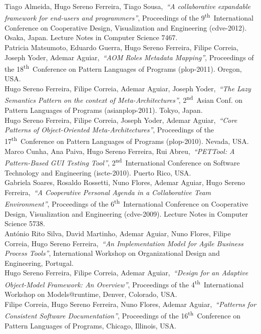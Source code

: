 \documentclass[9pt, a4paper, pstricks]{article}
\newcommand{\years}[1]{\marginnote{\small #1}}
\newcommand{\nth}{\textsuperscript{th}~}
\newcommand{\nd}{\textsuperscript{nd}~}
\newcommand{\publication}[4]{\years{#1}#2,~\emph{``#3''}, #4}
\begin{document}
{\publication{2012}{Tiago Almeida, Hugo Sereno Ferreira, Tiago Sousa}{A collaborative expandable framework for end-users and programmers}{Proceedings of the 9\nth International Conference on Cooperative Design, Visualization and Engineering {\sc (cdve-2012)}. Osaka, Japan. Lecture Notes in Computer Science 7467.}\\
\publication{2011}{Patricia Matsumoto, Eduardo Guerra, Hugo Sereno Ferreira, Filipe Correia, Joseph Yoder, Ademar Aguiar}{AOM Roles Metadata Mapping}{Proceedings of the 18\nth Conference on Pattern Languages of Programs {\sc (plop-2011)}. Oregon, USA.}\\
\publication{2011}{Hugo Sereno Ferreira, Filipe Correia, Ademar Aguiar, Joseph Yoder}{The Lazy Semantics Pattern on the context of Meta-Architectures}{2\nd Asian Conf. on Pattern Languages of Programs {\sc (asianplop-2011)}. Tokyo, Japan.}\\
\publication{2010}{Hugo Sereno Ferreira, Filipe Correia, Joseph Yoder, Ademar Aguiar}{Core Patterns of Object-Oriented Meta-Architectures}{Proceedings of the 17\nth Conference on Pattern Languages of Programs  {\sc (plop-2010)}. Nevada, USA.}\\
\publication{2010}{Marco Cunha, Ana Paiva, Hugo Sereno Ferreira, Rui Abreu}{PETTool: A Pattern-Based GUI Testing Tool}{2\nd International Conference on Software Technology and Engineering  {\sc (iscte-2010)}. Puerto Rico, USA.}\\
\publication{2009}{Gabriela Soares, Rosaldo Rossetti, Nuno Flores, Ademar Aguiar, Hugo Sereno Ferreira}{A Cooperative Personal Agenda in a Collaborative Team Environment}{Proceedings of the 6\nth International Conference on Cooperative Design, Visualization and Engineering {\sc (cdve-2009)}. Lecture Notes in Computer Science 5738.}\\
\publication{2009}{António Rito Silva, David Martinho, Ademar Aguiar, Nuno Flores, Filipe Correia, Hugo Sereno Ferreira}{An Implementation Model for Agile Business Process Tools}{International Workshop on Organizational Design and Engineering, Portugal.}\\
\publication{2009}{Hugo Sereno Ferreira, Filipe Correia, Ademar Aguiar}{Design for an Adaptive Object-Model Framework: An Overview}{Proceedings of the 4\nth International Workshop on Models@runtime, Denver, Colorado, USA.}\\
\publication{2009}{Filipe Correia, Hugo Sereno Ferreira, Nuno Flores, Ademar Aguiar}{Patterns for Consistent Software Documentation}{Proceedings of the 16\nth Conference on Pattern Languages of Programs, Chicago, Illinois, USA.}\\
}
\end{document}
